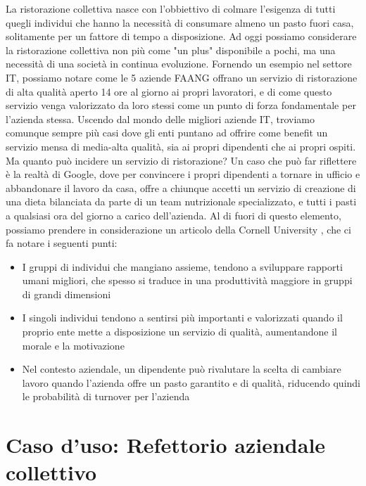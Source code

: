 \documentclass[a4paper, titlepage, 12pt, openright, twoside]{book}
\begin{document}
La ristorazione collettiva nasce con l'obbiettivo di colmare l'esigenza di tutti quegli individui
che hanno la necessità di consumare almeno un pasto fuori casa, solitamente per un fattore di tempo a disposizione.
Ad oggi possiamo considerare la ristorazione collettiva non più come "un plus" disponibile a pochi, ma una necessità di una società in continua evoluzione.
Fornendo un esempio nel settore IT, possiamo notare come le 5 aziende FAANG offrano un servizio di ristorazione di alta qualità aperto 14 ore al giorno ai propri lavoratori,
e di come questo servizio venga valorizzato da loro stessi come un punto di forza fondamentale per l'azienda stessa.
\newline
Uscendo dal mondo delle migliori aziende IT, troviamo comunque sempre più casi dove gli enti puntano ad offrire come benefit un servizio mensa di media-alta qualità,
sia ai propri dipendenti che ai propri ospiti.
\newline
Ma quanto può incidere un servizio di ristorazione?
\newline
Un caso che può far riflettere è la realtà di Google, dove per convincere i propri dipendenti a tornare in ufficio e abbandonare il lavoro da casa,
offre a chiunque accetti un servizio di creazione di una dieta bilanciata da parte di un team nutrizionale specializzato, e tutti i pasti a qualsiasi ora del giorno a carico dell'azienda.
Al di fuori di questo elemento, possiamo prendere in considerazione un articolo della Cornell University \cite{cornell}, che ci fa notare i seguenti punti:
\begin{itemize}
	\item I gruppi di individui che mangiano assieme, tendono a sviluppare rapporti umani migliori, che spesso si traduce in una produttività maggiore in gruppi di grandi dimensioni
	\item I singoli individui tendono a sentirsi più importanti e valorizzati quando il proprio ente mette a disposizione un servizio di qualità, aumentandone il morale e la motivazione
	\item Nel contesto aziendale, un dipendente può rivalutare la scelta di cambiare lavoro quando l'azienda offre un pasto garantito e di qualità,
			riducendo quindi le probabilità di turnover per l'azienda
\end{itemize}

\chapter{Caso d'uso: Refettorio aziendale collettivo}\label{chap:caso}
\end{document}
